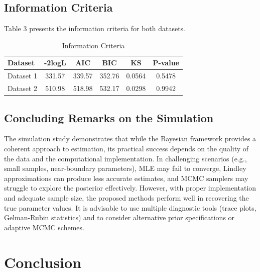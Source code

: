 \documentclass[12pt]{article}
\begin{document}
\subsection{Information Criteria}



Table 3 presents the information criteria for both datasets.



\begin{table}[htbp]
\centering
\caption{Information Criteria}
\label{tab:criteria}
\begin{tabular}{lccccc}
\toprule
Dataset & -2logL & AIC & BIC & KS & P-value \\
\midrule
Dataset 1 & 331.57 & 339.57 & 352.76 & 0.0564 & 0.5478 \\
Dataset 2 & 510.98 & 518.98 & 532.17 & 0.0298 & 0.9942 \\
\bottomrule
\end{tabular}
\end{table}



\subsection{Concluding Remarks on the Simulation}



The simulation study demonstrates that while the Bayesian framework provides a
coherent approach to estimation, its practical success depends on the quality
of the data and the computational implementation. In challenging scenarios
(e.g., small samples, near-boundary parameters), MLE may fail to converge,
Lindley approximations can produce less accurate estimates, and MCMC samplers
may struggle to explore the posterior effectively. However, with proper
implementation and adequate sample size, the proposed methods perform well in
recovering the true parameter values. It is advisable to use multiple diagnostic
tools (trace plots, Gelman-Rubin statistics) and to consider alternative prior
specifications or adaptive MCMC schemes.



\section{Conclusion}
\end{document}
